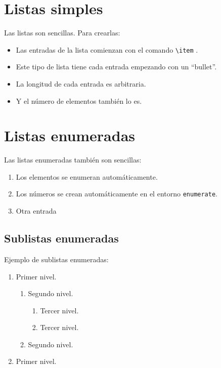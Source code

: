 \section{Listas simples}

Las listas son sencillas. Para crearlas:
\begin{itemize}
  \item Las entradas de la lista comienzan con el comando \verb|\item| .
  \item Este tipo de lista tiene cada entrada empezando con un ``bullet''.
  \item La longitud de cada entrada es arbitraria.
  \item Y el número de elementos también lo es.
\end{itemize}


\section{Listas enumeradas}

Las listas enumeradas también son sencillas:
\begin{enumerate}
  \item Los elementos se enumeran automáticamente.
  \item Los números  se crean automáticamente en el entorno \texttt{enumerate}.
  \item Otra entrada
\end{enumerate}


\subsection{Sublistas enumeradas}

Ejemplo de sublistas enumeradas:
\begin{enumerate}
  \item Primer nivel.
  \begin{enumerate}
    \item Segundo nivel.
    \begin{enumerate}
      \item Tercer nivel.
      \item Tercer nivel.
    \end{enumerate}
    \item Segundo nivel.
  \end{enumerate}
  \item Primer nivel.
\end{enumerate}

